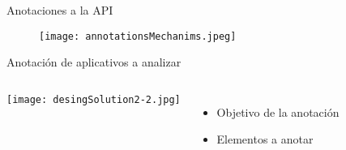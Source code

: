 \begin{frame}{Anotaciones a la API}
	\begin{figure}[t!]
		\begin{center} 
		\texttt{[image: annotationsMechanims.jpeg]} 
		\end{center}
	\end{figure}
\end{frame}
\begin{frame}{Anotación de aplicativos a analizar}
	\begin{columns}[c]
			\texttt{[image: desingSolution2-2.jpg]}
		\column{1.5in}
			\begin{itemize}
	  		\item Objetivo de la anotación
	  		\item Elementos a anotar
			\end{itemize}
	\end{columns}
\end{frame}
